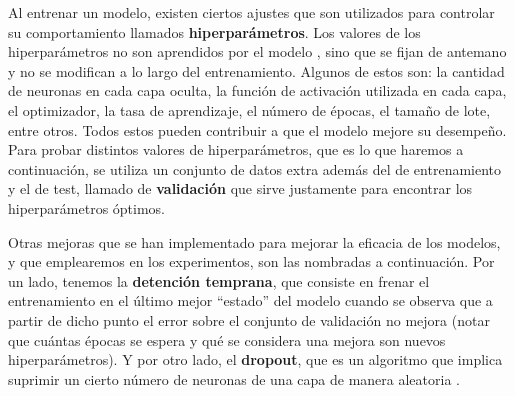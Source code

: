 \documentclass[../../main.tex]{subfiles}
\begin{document}
Al entrenar un modelo, existen ciertos ajustes que son utilizados para controlar su comportamiento llamados \textbf{hiperparámetros}. Los valores de los hiperparámetros no son aprendidos por el modelo \cite{deep-learning}, sino que se fijan de antemano y no se modifican a lo largo del entrenamiento. Algunos de estos son: la cantidad de neuronas en cada capa oculta, la función de activación utilizada en cada capa, el optimizador, la tasa de aprendizaje, el número de épocas, el tamaño de lote, entre otros. Todos estos pueden contribuir a que el modelo mejore su desempeño. Para probar distintos valores de hiperparámetros, que es lo que haremos a continuación, se utiliza un conjunto de datos extra además del de entrenamiento y el de test, llamado de \textbf{validación} que sirve justamente para encontrar los hiperparámetros óptimos.

Otras mejoras que se han implementado para mejorar la eficacia de los modelos, y que emplearemos en los experimentos, son las nombradas a continuación. Por un lado, tenemos la \textbf{detención temprana}, que consiste en frenar el entrenamiento en el último mejor ``estado'' del modelo cuando se observa que a partir de dicho punto el error sobre el conjunto de validación no mejora (notar que cuántas épocas se espera y qué se considera una mejora son nuevos hiperparámetros). Y por otro lado, el \textbf{dropout}, que es un algoritmo que implica suprimir un cierto número de neuronas de una capa de manera aleatoria \cite{apuntes-redes-neuronales}. 
\end{document}
